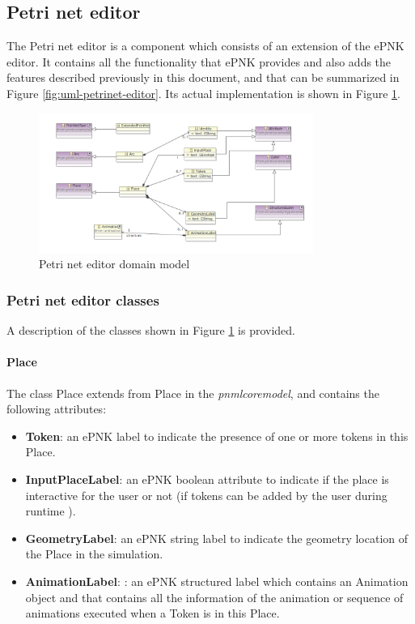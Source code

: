 \subsection{Petri net editor}

The Petri net editor is a component which consists of an extension of the ePNK editor. It contains all the functionality that ePNK provides and also adds the features described previously in this document, and that can be summarized in Figure \ref{fig:uml-petrinet-editor}. Its actual implementation is shown in Figure \ref{fig:petri-net-domain-model}.

\begin{figure}[htp]
\begin{center}
  \includegraphics[width=0.8\textwidth]{image/petrinet_editor_domain.png}
  \caption{Petri net editor domain model}
  \label{fig:petri-net-domain-model}
\end{center}
\end{figure}

\subsubsection{Petri net editor classes}

A description of the classes shown in Figure \ref{fig:petri-net-domain-model} is provided.

\paragraph{Place}

The class Place extends from Place in the \textit{pnmlcoremodel}, and contains the following attributes:

\begin{itemize}
	\item \textbf{Token}: an ePNK label to indicate the presence of one or more tokens in this Place.
	\item \textbf{InputPlaceLabel}: an ePNK boolean attribute to indicate if the place is interactive for the user or not (if tokens can be added by the user during runtime ).
	\item \textbf{GeometryLabel}: an ePNK string label to indicate the geometry location of the Place in the simulation.
	\item \textbf{AnimationLabel}: : an ePNK structured label which contains an Animation object and that contains all the information of the animation or sequence of animations executed when a Token is in this Place.
\end{itemize}

